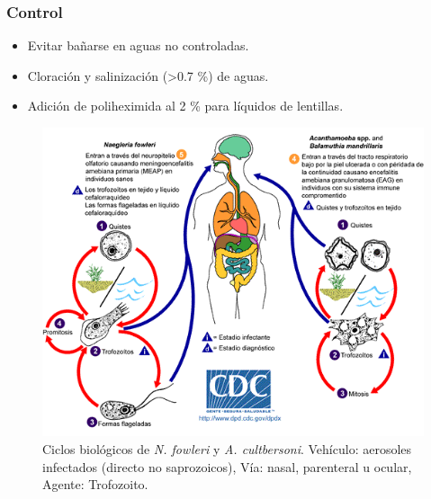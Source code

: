 \subsubsection{Control}
\begin{itemize}[itemsep=0pt,parsep=0pt,topsep=0pt,partopsep=0pt]
	\item Evitar bañarse en aguas no controladas.
	\item Cloración y salinización (>0.7 \%) de aguas.
	\item Adición de poliheximida al 2 \% para líquidos de lentillas.
\end{itemize}
\begin{figure}[H]
	\centering
	\includegraphics[width=0.65\columnwidth]{A.imagenes/ACV-BioSan-Parasit-AAnfizCbios}
	\caption[Ciclos biológicos de \textit{N. fowleri} y \textit{A. cultbersoni}.]{Ciclos biológicos de \textit{N. fowleri} y \textit{A. cultbersoni}. Vehículo: aerosoles infectados (directo no saprozoicos), Vía: nasal, parenteral u ocular, Agente: Trofozoito.\label{fig:PARASIT:AAnfizCBios}}
\end{figure}

